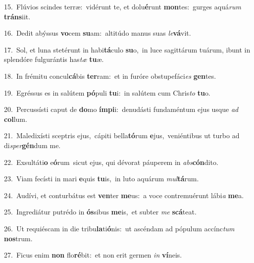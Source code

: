 {\numbfont\textcolor{\numbcolor}{15.}}~Flúvios scindes terræ:~\dagger vidérunt te, et dolu\-\textbf{é}\-runt \textbf{mon}\-tes:~\star gurges aquá\textit{rum} \textbf{tráns}\-iit.\par
{\numbfont\textcolor{\numbcolor}{16.}}~Dedit abýssus \textbf{vo}\-cem \textbf{su}\-am:~\star altitúdo manus suas \textit{le}\-\textbf{vá}vit.\par
{\numbfont\textcolor{\numbcolor}{17.}}~Sol, et luna stetérunt in habi\-\textbf{tá}\-culo \textbf{su}\-o,~\star in luce sagittárum tuárum, ibunt in splendóre fulgurántis has\textit{tæ} \textbf{tu}\-æ.\par
{\numbfont\textcolor{\numbcolor}{18.}}~In frémitu concul\-\textbf{cá}\-bis \textbf{ter}\-ram:~\star et in furóre obstupefáci\textit{es} \textbf{gen}\-tes.\par
{\numbfont\textcolor{\numbcolor}{19.}}~Egréssus es in salútem \textbf{pó}\-puli \textbf{tu}\-i:~\star in salútem cum Chris\textit{to} \textbf{tu}\-o.\par
{\numbfont\textcolor{\numbcolor}{20.}}~Percussísti caput de \textbf{do}\-mo \textbf{ím}\-\textbf{pi}i:~\star denudásti fundaméntum ejus usque \textit{ad} \textbf{col}\-lum.\par
{\numbfont\textcolor{\numbcolor}{21.}}~Maledixísti sceptris ejus,~\dagger cápiti bella\-\textbf{tó}\-rum \textbf{e}\-jus,~\star veniéntibus ut turbo ad di\-\textit{sper}\-\textbf{gén}dum me.\par
{\numbfont\textcolor{\numbcolor}{22.}}~Exsultáti\textbf{o} e\-\textbf{ó}\-rum~\star sicut ejus, qui dévorat páuperem in \textit{abs}\-\textbf{cón}dito.\par
{\numbfont\textcolor{\numbcolor}{23.}}~Viam fecísti in mari \textbf{e}\-quis \textbf{tu}\-is,~\star in luto aquárum \textit{mul}\-\textbf{tá}rum.\par
{\numbfont\textcolor{\numbcolor}{24.}}~Audívi, et conturbátus est \textbf{ven}\-ter \textbf{me}\-us:~\star a voce contremuérunt lábi\textit{a} \textbf{me}\-a.\par
{\numbfont\textcolor{\numbcolor}{25.}}~Ingrediátur putrédo in \textbf{ós}\-sibus \textbf{me}\-is,~\star et subter \textit{me} \textbf{scá}\-teat.\par
{\numbfont\textcolor{\numbcolor}{26.}}~Ut requiéscam in die tribu\-\textbf{la}\-ti\-\textbf{ó}\-nis:~\star ut ascéndam ad pópulum accínc\textit{tum} \textbf{nos}\-trum.\par
{\numbfont\textcolor{\numbcolor}{27.}}~Ficus enim \textbf{non} flo\-\textbf{ré}\-bit:~\star et non erit germen \textit{in} \textbf{ví}\-neis.\par
